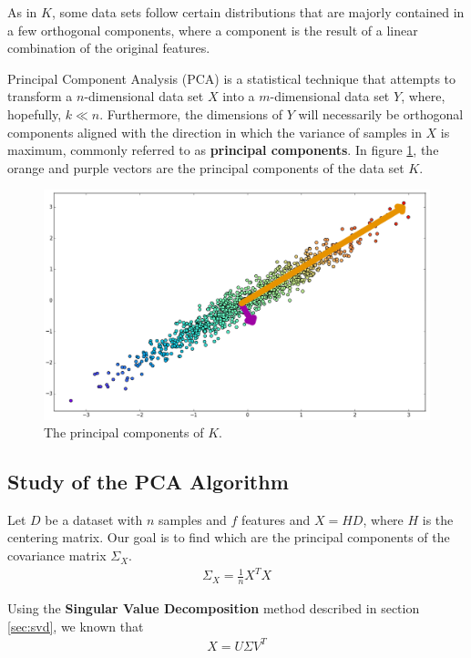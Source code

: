 \documentclass[12pt]{report}
\begin{document}
As in $K$, some data sets follow certain distributions that are majorly contained in a few orthogonal components, where a component is the result of a linear combination of the original features.

Principal Component Analysis (PCA) is a statistical technique that attempts to transform a $n$-dimensional data set $X$ into a $m$-dimensional data set $Y$, where, hopefully, $k \ll n$. Furthermore, the dimensions of $Y$ will necessarily be orthogonal components aligned with the direction in which the variance of samples in $X$ is maximum, commonly referred to as \textbf{principal components}. \cite{pca1989} In figure \ref{fig:datasetrpc}, the orange and purple vectors are the principal components of the data set $K$.

\begin{figure}[H]
	\centering
	\captionsetup{justification=centering}
	\includegraphics[width=.8\linewidth]{datasets/r_pcs}
	\caption{The principal components of $K$.}
	\label{fig:datasetrpc}
\end{figure}

\subsection{Study of the PCA Algorithm}

Let $D$ be a dataset with $n$ samples and $f$ features and $X=HD$, where $H$ is the centering matrix. Our goal is to find which are the principal components of the covariance matrix $\Sigma_X$.
\begin{align}
	\label{eq:pca-cov}
	\Sigma_X=\frac{1}{n} X^TX
\end{align}

Using the \textbf{Singular Value Decomposition} method described in section \ref{sec:svd}, we known that
\begin{align}
	\label{eq:pca-svd}
	X = U\Sigma V^T
\end{align}
\end{document}
